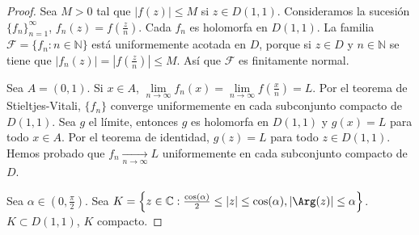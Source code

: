 \begin{proof}
    Sea $M > 0$ tal que $|f(z)| \leq M$ si $z \in D(1, 1)$.
    Consideramos la sucesión $\{f_n\}_{n=1}^\infty$, $f_n(z) = f\left(\frac{z}{n}\right)$.
    Cada $f_n$ es holomorfa en $D(1, 1)$.
    La familia $\mathcal{F} = \{f_n : n \in \mathbb{N}\}$ está uniformemente acotada en $D$, porque si $z \in D$ y $n \in \mathbb{N}$ se tiene que $|f_n(z)| = \left|f\left(\frac{z}{n}\right)\right| \leq M$.
    Así que $\mathcal{F}$ es finitamente normal.

    Sea $A = (0, 1)$.
    Si $x \in A$, $\lim\limits_{n \to \infty} f_n(x) = \lim\limits_{n \to \infty} f\left(\frac{x}{n}\right) = L$.
    Por el teorema de Stieltjes-Vitali, $\{f_n\}$ converge uniformemente en cada subconjunto compacto de $D(1, 1)$.
    Sea $g$ el límite, entonces $g$ es holomorfa en $D(1, 1)$ y $g(x) = L$ para todo $x \in A$.
    Por el teorema de identidad, $g(z) = L$ para todo $z \in D(1, 1)$.
    Hemos probado que $f_n \xrightarrow[n \to \infty]{} L$ uniformemente en cada subconjunto compacto de $D$.

    Sea $\alpha \in (0, \frac{\pi}{2})$.
    Sea $K = \left\{z \in \mathbb{C} : \frac{\cos(\alpha)}{2} \leq |z| \leq \cos(\alpha), |\Arg(z)| \leq \alpha\right\}$.
    $K \subset D(1, 1)$, $K$ compacto.

\end{proof}